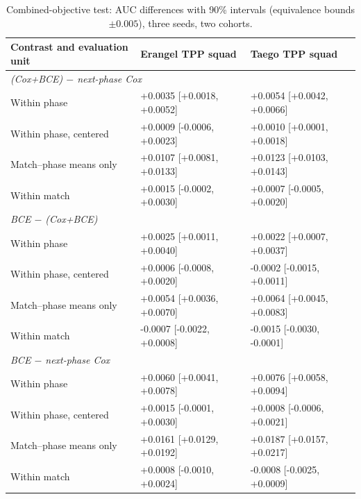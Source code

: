 \documentclass[sigconf,anonymous,nonacm]{acmart}
\begin{document}
\begin{table}[t]
\centering\footnotesize
\caption{Combined-objective test: AUC differences with 90\% intervals (equivalence bounds $\pm0.005$), three seeds, two cohorts.}
\label{tab:coxbce}
\begin{tabular}{lll}
\toprule
Contrast and evaluation unit & Erangel TPP squad & Taego TPP squad \\
\midrule
\multicolumn{3}{l}{\emph{(Cox+BCE) $-$ next-phase Cox}} \\
\quad Within phase & +0.0035 [+0.0018, +0.0052] & +0.0054 [+0.0042, +0.0066] \\
\quad Within phase, centered & +0.0009 [-0.0006, +0.0023] & +0.0010 [+0.0001, +0.0018] \\
\quad Match--phase means only & +0.0107 [+0.0081, +0.0133] & +0.0123 [+0.0103, +0.0143] \\
\quad Within match & +0.0015 [-0.0002, +0.0030] & +0.0007 [-0.0005, +0.0020] \\
\multicolumn{3}{l}{\emph{BCE $-$ (Cox+BCE)}} \\
\quad Within phase & +0.0025 [+0.0011, +0.0040] & +0.0022 [+0.0007, +0.0037] \\
\quad Within phase, centered & +0.0006 [-0.0008, +0.0020] & -0.0002 [-0.0015, +0.0011] \\
\quad Match--phase means only & +0.0054 [+0.0036, +0.0070] & +0.0064 [+0.0045, +0.0083] \\
\quad Within match & -0.0007 [-0.0022, +0.0008] & -0.0015 [-0.0030, -0.0001] \\
\multicolumn{3}{l}{\emph{BCE $-$ next-phase Cox}} \\
\quad Within phase & +0.0060 [+0.0041, +0.0078] & +0.0076 [+0.0058, +0.0094] \\
\quad Within phase, centered & +0.0015 [-0.0001, +0.0030] & +0.0008 [-0.0006, +0.0021] \\
\quad Match--phase means only & +0.0161 [+0.0129, +0.0192] & +0.0187 [+0.0157, +0.0217] \\
\quad Within match & +0.0008 [-0.0010, +0.0024] & -0.0008 [-0.0025, +0.0009] \\
\bottomrule
\end{tabular}
\end{table}
\end{document}
